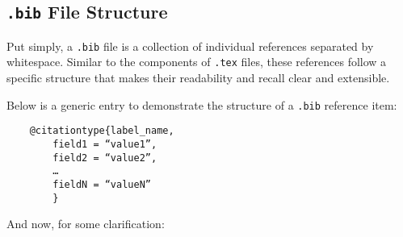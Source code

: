 \documentclass{article}
\begin{document}
\subsection{\texttt{.bib} File Structure}
Put simply, a \texttt{.bib} file is a collection of individual references separated by whitespace. Similar to the components of \texttt{.tex} files, these references follow a specific structure that makes their readability and recall clear and extensible.

Below is a generic entry to demonstrate the structure of a \texttt{.bib} reference item:
\begin{verbatim}
    @citationtype{label_name,
    	field1 = “value1”,
    	field2 = “value2”,
    	…
    	fieldN = “valueN”
        }
\end{verbatim}

And now, for some clarification:
\end{document}
